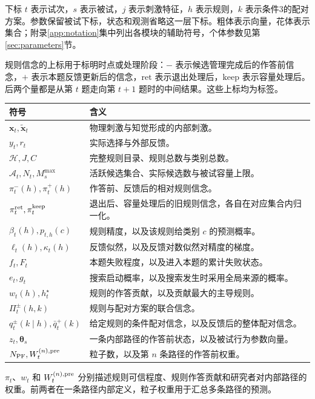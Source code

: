 \documentclass[12pt]{article}
\begin{document}
下标 $t$ 表示试次，$s$ 表示被试，$j$ 表示刺激特征，$h$ 表示规则，$k$ 表示条件3的配对方案。参数保留被试下标，状态和观测省略这一层下标。粗体表示向量，花体表示集合；附录\ref{app:notation}集中列出各模块的辅助符号，个体参数见第\ref{sec:parameters}节。

规则信念的上标用于标明时点或处理阶段：$-$ 表示候选管理完成后的作答前信念，$+$ 表示本题反馈更新后的信念，$\mathrm{ret}$ 表示退出处理后，$\mathrm{keep}$ 表示容量处理后。后两个量都是从第 $t$ 题走向第 $t+1$ 题时的中间结果。这些上标均为标签。

{\small
\begin{longtable}{L{3.5cm}L{10.5cm}}
\toprule
符号 & 含义\\
\midrule
\endhead
$\bm x_t,\widetilde{\bm x}_t$ & 物理刺激与知觉形成的内部刺激。\\
$y_t,r_t$ & 实际选择与外部反馈。\\
$\mathcal H,J,C$ & 完整规则目录、规则总数与类别总数。\\
$\mathcal A_t,N_t,M_s^{\max}$ & 活跃候选集合、实际候选数与被试容量上限。\\
$\pi_t^-(h),\pi_t^+(h)$ & 作答前、反馈后的相对规则信念。\\
$\pi_t^{\rm ret},\pi_t^{\rm keep}$ & 退出后、容量处理后的旧规则信念，各自在对应集合内归一化。\\
$\beta_t(h),p_{t,h}(c)$ & 规则精度，以及该规则给类别 $c$ 的预测概率。\\
$\ell_t(h),\kappa_t(h)$ & 反馈似然，以及反馈对数似然对精度的梯度。\\
$f_t,F_t$ & 本题失败程度，以及进入本题的累计失败状态。\\
$e_t,g_t$ & 搜索启动概率，以及搜索发生时采用全局来源的概率。\\
$w_t(h),h_t^\star$ & 规则的作答贡献，以及贡献最大的主导规则。\\
$\Pi_t^{\pm}(h,k)$ & 规则与配对方案的联合信念。\\
$q_t^{\pm}(k\mid h),\bar q_t^+(k)$ & 给定规则的条件配对信念，以及反馈后的整体配对信念。\\
$z_t,\bm\theta_s$ & 一条内部路径的作答前状态，以及被试行为参数向量。\\
$N_{\rm PF},W_t^{(n),{\rm pre}}$ & 粒子数，以及第 $n$ 条路径的作答前权重。\\
\bottomrule
\end{longtable}
}

$\pi_t$、$w_t$ 和 $W_t^{(n),{\rm pre}}$ 分别描述规则可信程度、规则作答贡献和研究者对内部路径的权重。前两者在一条路径内部定义，粒子权重用于汇总多条路径的预测。
\end{document}
